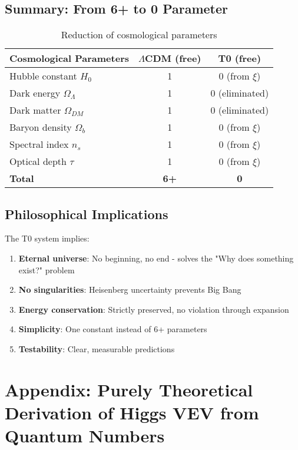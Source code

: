 \documentclass[12pt,a4paper]{article}
\begin{document}
\subsection{Summary: From 6+ to 0 Parameter}
\label{subsec:cosmic_summary}

\begin{table}[h]
	\centering
	\begin{tabular}{lcc}
		\toprule
		\textbf{Cosmological Parameters} & \textbf{$\Lambda$CDM (free)} & \textbf{T0 (free)} \\
		\midrule
		Hubble constant $H_0$ & 1 & 0 (from $\xi$) \\
		Dark energy $\Omega_{\Lambda}$ & 1 & 0 (eliminated) \\
		Dark matter $\Omega_{DM}$ & 1 & 0 (eliminated) \\
		Baryon density $\Omega_b$ & 1 & 0 (from $\xi$) \\
		Spectral index $n_s$ & 1 & 0 (from $\xi$) \\
		Optical depth $\tau$ & 1 & 0 (from $\xi$) \\
		\midrule
		\textbf{Total} & \textbf{6+} & \textbf{0} \\
		\bottomrule
	\end{tabular}
	\caption{Reduction of cosmological parameters}
\end{table}


\subsection{Philosophical Implications}
\label{subsec:philosophical_implications}

The T0 system implies:
\begin{enumerate}
	\item \textbf{Eternal universe}: No beginning, no end - solves the "Why does something exist?" problem
	\item \textbf{No singularities}: Heisenberg uncertainty prevents Big Bang
	\item \textbf{Energy conservation}: Strictly preserved, no violation through expansion
	\item \textbf{Simplicity}: One constant instead of 6+ parameters
	\item \textbf{Testability}: Clear, measurable predictions
\end{enumerate}
\section{Appendix: Purely Theoretical Derivation of Higgs VEV from Quantum Numbers}
\end{document}
